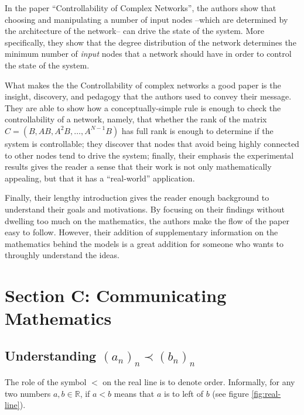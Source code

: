 \documentclass[11pt]{article}
\begin{document}
In the paper ``Controllability of Complex Networks'', the authors show that choosing and manipulating a number of input nodes --which are determined by the architecture of the network-- can drive the state of the system. More specifically, they show that the degree distribution of the network determines the minimum number of \textit{input} nodes that a network should have in order to control the state of the system.

What makes the the Controllability of complex networks a good paper is the insight, discovery, and pedagogy that the authors used to convey their message. They are able to show how a conceptually-simple rule is enough to check the controllability of a network, namely, that whether the rank of the matrix $C = (B, AB, A^2B, \ldots, A^{N-1}B)$  has full rank is enough to determine if the system is controllable; they discover that nodes that avoid being highly connected to other nodes tend to drive the system; finally, their emphasis the experimental results gives the reader a sense that their work is not only mathematically appealing, but that it has a ``real-world'' application.

Finally, their lengthy introduction gives the reader enough background to understand their goals and motivations. By focusing on their findings without dwelling too much on the mathematics, the authors make the flow of the paper easy to follow. However, their addition of supplementary information on the mathematics behind the models is a great addition for someone who wants to throughly understand the ideas.


\section*{Section C: Communicating Mathematics}

\subsection*{Understanding $(a_n)_n \prec (b_n)_n$}
The role of the symbol $<$ on the real line is to denote order. Informally, for any two numbers $a, b \in \mathbb{R}$, if $a < b$ means that $a$ is to left of $b$ (see figure \ref{fig:real-line}).

\begin{figure*}[h!]
	\centering
	
	\caption{Numbers on the real line. In this example, we see that $a < b$ since $a$ is to the left of $b$.}
	\label{fig:real-line}
\end{figure*}
\end{document}

